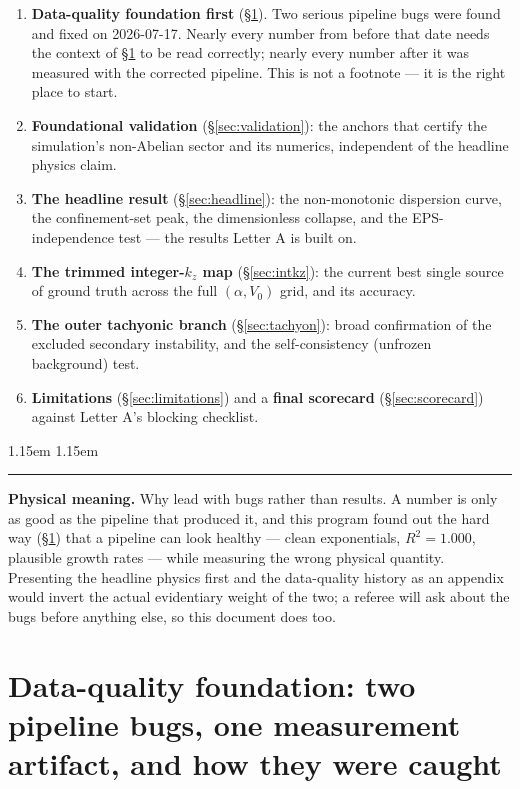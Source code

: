 \documentclass[11pt,a4paper]{article}
\numberwithin{equation}{section}
\theoremstyle{remark}
\newenvironment{physmeaning}%
{\par\medskip\noindent
 \begin{list}{}{\leftmargin 1.15em \rightmargin 1.15em \listparindent 0pt
 \itemindent 0pt \parsep 2pt \topsep 2pt}\item\relax
 \small\textcolor{meancol}{\rule[-0.6ex]{2.6pt}{2.4ex}}\hspace{0.55em}%
 \textcolor{meancol}{\textbf{Physical meaning.}}\hspace{0.5em}\ignorespaces}%
{\end{list}\medskip}
\newcommand{\Vo}{V_0}
\newcommand{\kz}{k_z}
\begin{document}
\begin{enumerate}
\item \textbf{Data-quality foundation first} (\S\ref{sec:pipeline}). Two
serious pipeline bugs were found and fixed on 2026-07-17. Nearly every
number from before that date needs the context of \S\ref{sec:pipeline} to
be read correctly; nearly every number after it was measured with the
corrected pipeline. This is not a footnote — it is the right place to
start.
\item \textbf{Foundational validation} (\S\ref{sec:validation}): the
anchors that certify the simulation's non-Abelian sector and its
numerics, independent of the headline physics claim.
\item \textbf{The headline result} (\S\ref{sec:headline}): the
non-monotonic dispersion curve, the confinement-set peak, the
dimensionless collapse, and the EPS-independence test — the results
Letter A is built on.
\item \textbf{The trimmed integer-$\kz$ map} (\S\ref{sec:intkz}): the
current best single source of ground truth across the full $(\alpha,\Vo)$
grid, and its accuracy.
\item \textbf{The outer tachyonic branch} (\S\ref{sec:tachyon}): broad
confirmation of the excluded secondary instability, and the
self-consistency (unfrozen background) test.
\item \textbf{Limitations} (\S\ref{sec:limitations}) and a
\textbf{final scorecard} (\S\ref{sec:scorecard}) against Letter A's
blocking checklist.
\end{enumerate}

\begin{physmeaning}
Why lead with bugs rather than results. A number is only as good as the
pipeline that produced it, and this program found out the hard way
(\S\ref{sec:pipeline}) that a pipeline can look healthy — clean
exponentials, $R^2=1.000$, plausible growth rates — while measuring the
wrong physical quantity. Presenting the headline physics first and the
data-quality history as an appendix would invert the actual evidentiary
weight of the two; a referee will ask about the bugs before anything
else, so this document does too.
\end{physmeaning}

\section{Data-quality foundation: two pipeline bugs, one measurement
artifact, and how they were caught}
\label{sec:pipeline}
\end{document}
